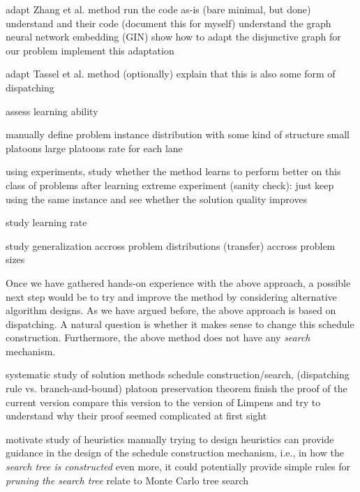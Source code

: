 \documentclass{article}
\theoremstyle{definition}
\theoremstyle{plain}
\begin{document}
\begin{outline}
\1 adapt Zhang et al. \cite{zhangLearningDispatchJob2020} method
    \2 run the code as-is (bare minimal, but done)
    \2 understand and their code (document this for myself)
    \2 understand the graph neural network embedding (GIN)
    \2 show how to adapt the disjunctive graph for our problem
    \2 implement this adaptation

\1 adapt Tassel et al. \cite{tasselReinforcementLearningEnvironment2021} method (optionally)
    \2 explain that this is also some form of dispatching

\1 assess learning ability

    \2 manually define problem instance distribution with some kind of structure
      \3 small platoons
      \3 large platoons
      \3 rate for each lane

      \2 using experiments, study whether the method learns to perform better on
      this class of problems after learning \3 extreme experiment (sanity
      check): just keep using the same instance and see whether the solution
      quality improves

    \2 study learning rate

    \2 study generalization
      \3 accross problem distributions (transfer)
      \3 accross problem sizes
\end{outline}

Once we have gathered hands-on experience with the above approach, a possible
next step would be to try and improve the method by considering alternative
algorithm designs. As we have argued before, the above approach is based on
dispatching. A natural question is whether it makes sense to change this
schedule construction. Furthermore, the above method does not have any
\textit{search} mechanism.
\begin{outline}
\1 systematic study of solution methods
    \2 schedule construction/search, (dispatching rule vs. branch-and-bound)
    \2 platoon preservation theorem
      \3 finish the proof of the current version
      \3 compare this version to the version of Limpens and try to understand why their proof seemed complicated at first sight

    \2 motivate study of heuristics
      \3 manually trying to design heuristics can provide guidance in the design of the schedule construction mechanism, i.e., in how the \textit{search tree is constructed}
      \3 even more, it could potentially provide simple rules for \textit{pruning the search tree}
      \3 relate to Monte Carlo tree search
\end{outline}
\end{document}
